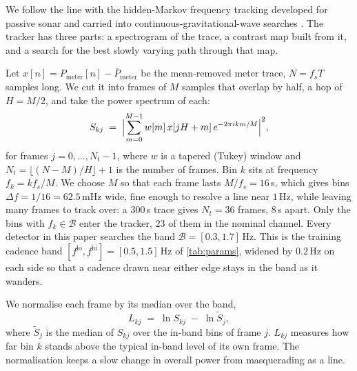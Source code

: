 \documentclass{article}
\begin{document}
We follow the line with the hidden-Markov frequency tracking developed for
passive sonar \citep{streit1990frequency} and carried into
continuous-gravitational-wave searches
\citep{suvorova2016hmm,bayley2019soap,kimpson2024anc}. The tracker has
three parts: a spectrogram of the trace, a contrast map built from it, and a
search for the best slowly varying path through that map.

Let $x[n] = P_{\mathrm{meter}}[n] - \bar
P_{\mathrm{meter}}$ be the mean-removed meter trace, $N = f_s T$ samples long.
We cut it into frames of $M$ samples that overlap by half, a hop of $H = M/2$,
and take the power spectrum of each:
\begin{equation}
	S_{kj} \;=\; \Bigl\lvert \sum_{m=0}^{M-1} w[m]\,x[jH + m]\,
	e^{-2\pi i k m / M} \Bigr\rvert^2,
	\label{eq:spectrogram}
\end{equation}
for frames $j = 0, \dots, N_t - 1$, where $w$ is a tapered (Tukey) window and $N_t = \lfloor (N - M)/H \rfloor + 1$
is the number of frames. Bin $k$ sits at frequency $f_k = k f_s / M$. We
choose $M$ so that each frame lasts $M/f_s = 16$\,s, which gives bins
$\Delta f = 1/16 = 62.5$\,mHz wide, fine enough to resolve a line near $1$\,Hz,
while leaving many frames to track over: a $300$\,s trace gives $N_t = 36$
frames, $8$\,s apart. Only the bins with $f_k \in \mathcal{B}$ enter the
tracker, $23$ of them in the nominal channel. Every detector in this paper searches the band
$\mathcal{B} = [0.3, 1.7]$\,Hz. This is the training cadence band
$[f^{\mathrm{lo}}, f^{\mathrm{hi}}] = [0.5, 1.5]$\,Hz of \cref{tab:params},
widened by $0.2$\,Hz on each side so that a cadence drawn near either edge
stays in the band as it wanders.

We normalise each frame by its median over the band,
\begin{equation}
	L_{kj} \;=\; \ln S_{kj} \;-\; \ln \tilde S_j,
	\label{eq:contrast}
\end{equation}
where $\tilde S_j$ is the median of $S_{kj}$ over the in-band bins of frame
$j$. $L_{kj}$ measures how far bin $k$ stands above the typical in-band level of
its own frame. The normalisation keeps a slow change in overall power from masquerading as a line.
\end{document}
